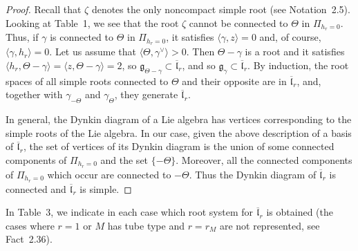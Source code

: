 \documentclass[10pt]{article}
\theoremstyle{definition}
\numberwithin{equation}{section}
\newcommand{\jepPubCoroot}{{\scriptscriptstyle\vee}}
\begin{document}
\begin{proof}
Recall that $\zeta$ denotes the only noncompact simple root (see Notation~2.5). Looking at Table~1, we see that the root $\zeta$ cannot be connected to $\Theta$ in $\Pi_{h_r=0}$. Thus, if $\gamma$ is connected to $\Theta$ in $\Pi_{h_r=0}$, it satisfies $\langle\gamma,z\rangle=0$ and, of course, $\langle\gamma,h_r\rangle=0$. Let us assume that $\langle\Theta,\gamma^\jepPubCoroot\rangle>0$. Then $\Theta-\gamma$ is a root and it satisfies $\langle h_r,\Theta-\gamma\rangle=\langle z,\Theta-\gamma\rangle=2$, so $\mathfrak g_{\Theta-\gamma}\subset\overline{\mathfrak l}_r$, and so $\mathfrak g_\gamma\subset\overline{\mathfrak l}_r$. By induction, the root spaces of all simple roots connected to $\Theta$ and their opposite are in $\overline{\mathfrak l}_r$, and, together with $\gamma_{-\Theta}$ and $\gamma_\Theta$, they generate $\overline{\mathfrak l}_r$.

In general, the Dynkin diagram of a Lie algebra has vertices corresponding to the simple roots of the Lie algebra. In our case, given the above description of a basis of $\overline{\mathfrak l}_r$, the set of vertices of its Dynkin diagram is the union of some connected components of $\Pi_{h_r=0}$ and the set $\{-\Theta\}$. Moreover, all the connected components of $\Pi_{h_r=0}$ which occur are connected to $-\Theta$. Thus the Dynkin diagram of $\overline{\mathfrak l}_r$ is connected and $\overline{\mathfrak l}_r$ is simple.
\end{proof}
In Table~3, we indicate in each case which root system for $\overline{\mathfrak l}_r$ is obtained (the cases where $r=1$ or $M$ has tube type and $r=r_M$ are not represented, see Fact~2.36).
\clearpage
\end{document}
